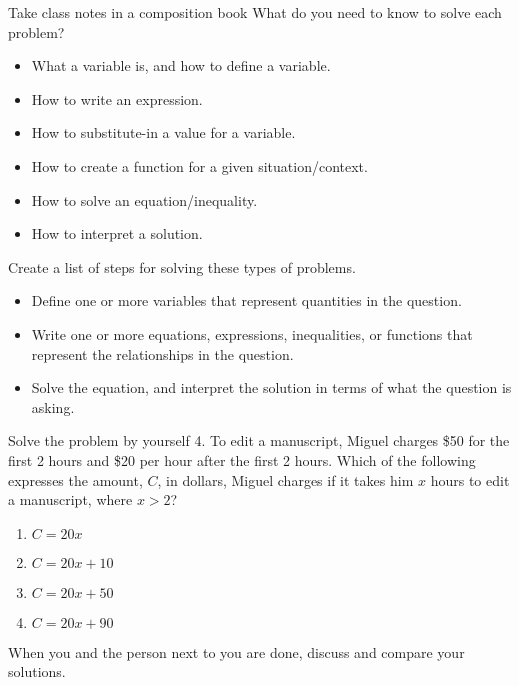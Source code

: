 \begin{frame}{Take class notes in a composition book}
  What do you need to know to solve each problem?
    \begin{itemize}
      \item What a variable is, and how to define a variable.
      \item How to write an expression.
      \item How to substitute-in a value for a variable.
      \item How to create a function for a given situation/context.
      \item How to solve an equation/inequality.
      \item How to interpret a solution.
    \end{itemize}
  Create a list of steps for solving these types of problems.
    \begin{itemize}
      \item Define one or more variables that represent quantities in the question.
      \item Write one or more equations, expressions, inequalities, or functions that represent the relationships in the question.
     \item Solve the equation, and interpret the solution in terms of what the question is asking.
  \end{itemize}
\end{frame}

\begin{frame}{Solve the problem by yourself}
  4. To edit a manuscript, Miguel charges \$50 for the first 2 hours and \$20 per hour after the first 2 hours. Which of the following expresses the amount, $C$, in dollars, Miguel charges if it takes him $x$ hours to edit a manuscript, where $x>2$?
  \begin{enumerate}
    \item $C=20x$
    \item $C=20x+10$
    \item $C=20x+50$
    \item $C=20x+90$
  \end{enumerate} \vspace{1cm}
  When you and the person next to you are done, discuss and compare your solutions.
\end{frame}
  
